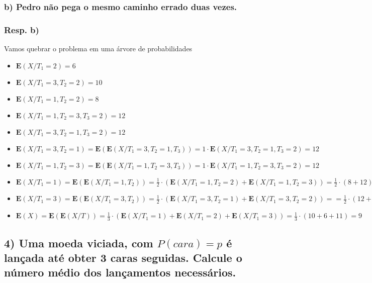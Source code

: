 \documentclass[english]{article}
\begin{document}
\subsubsection*{\textmd{b) Pedro não pega o mesmo caminho errado duas vezes.}}


\subsubsection*{\textmd{Resp}. \textmd{b)}}

Vamos quebrar o problema em uma árvore de probabilidades
\begin{itemize}
\item $\mathbf{E}(X/T_{1}=2)=6$
\item $\mathbf{E}(X/T_{1}=3,T_{2}=2)=10$
\item $\mathbf{E}(X/T_{1}=1,T_{2}=2)=8$
\item $\mathbf{E}(X/T_{1}=1,T_{2}=3,T_{3}=2)=12$
\item $\mathbf{E}(X/T_{1}=3,T_{2}=1,T_{3}=2)=12$
\item $\mathbf{E}(X/T_{1}=3,T_{2}=1)=\mathbf{E}(\mathbf{E}(X/T_{1}=3,T_{2}=1,T_{3}))=1\cdot\mathbf{E}(X/T_{1}=3,T_{2}=1,T_{3}=2)=12$
\item $\mathbf{E}(X/T_{1}=1,T_{2}=3)=\mathbf{E}(\mathbf{E}(X/T_{1}=1,T_{2}=3,T_{3}))=1\cdot\mathbf{E}(X/T_{1}=1,T_{2}=3,T_{3}=2)=12$
\item $\mathbf{E}(X/T_{1}=1)=\mathbf{E}(\mathbf{E}(X/T_{1}=1,T_{2}))=\frac{1}{2}\cdot(\mathbf{E}(X/T_{1}=1,T_{2}=2)+\mathbf{E}(X/T_{1}=1,T_{2}=3))=\frac{1}{2}\cdot(8+12)=10$
\item $\mathbf{E}(X/T_{1}=3)=\mathbf{E}(\mathbf{E}(X/T_{1}=3,T_{2}))=\frac{1}{2}\cdot(\mathbf{E}(X/T_{1}=3,T_{2}=1)+\mathbf{E}(X/T_{1}=3,T_{2}=2))==\frac{1}{2}\cdot(12+10)=11$
\item $\mathbf{E}(X)=\mathbf{E}(\mathbf{E}(X/T))=\frac{1}{3}\cdot(\mathbf{E}(X/T_{1}=1)+\mathbf{E}(X/T_{1}=2)+\mathbf{E}(X/T_{1}=3))=\frac{1}{3}\cdot(10+6+11)=9$
\end{itemize}

\subsection*{\textcompwordmark{}}


\subsection*{\textmd{4) Uma moeda viciada, com $P(cara)=p$ é lançada até obter
3 caras seguidas. Calcule o número médio dos lançamentos necessários.}}
\end{document}
